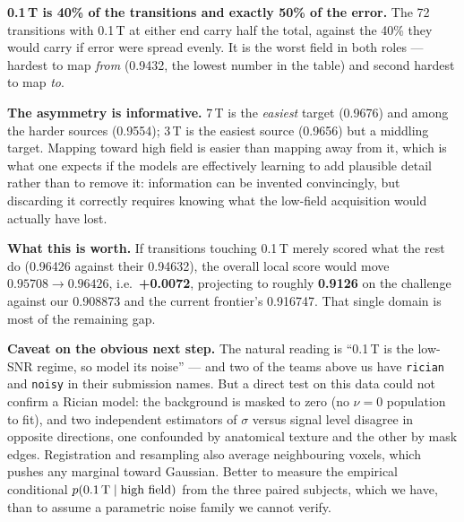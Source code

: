 \documentclass[10pt,a4paper]{article}
\begin{document}
\vspace{5mm}
{\small
\textbf{0.1\,T is 40\% of the transitions and exactly 50\% of the error.} The 72 transitions with
0.1\,T at either end carry half the total, against the 40\% they would carry if error were spread
evenly. It is the worst field in both roles --- hardest to map \emph{from} (0.9432, the lowest
number in the table) and second hardest to map \emph{to}.

\textbf{The asymmetry is informative.} 7\,T is the \emph{easiest} target (0.9676) and among the
harder sources (0.9554); 3\,T is the easiest source (0.9656) but a middling target. Mapping
toward high field is easier than mapping away from it, which is what one expects if the models
are effectively learning to add plausible detail rather than to remove it: information can be
invented convincingly, but discarding it correctly requires knowing what the low-field
acquisition would actually have lost.

\textbf{What this is worth.} If transitions touching 0.1\,T merely scored what the rest do
(0.96426 against their 0.94632), the overall local score would move
$0.95708 \rightarrow 0.96426$, i.e.\ \textbf{+0.0072}, projecting to roughly \textbf{0.9126} on
the challenge against our 0.908873 and the current frontier's 0.916747. That single domain is
most of the remaining gap.

\textbf{Caveat on the obvious next step.} The natural reading is ``0.1\,T is the low-SNR regime,
so model its noise'' --- and two of the teams above us have \texttt{rician} and \texttt{noisy} in
their submission names. But a direct test on this data could not confirm a Rician model: the
background is masked to zero (no $\nu=0$ population to fit), and two independent estimators of
$\sigma$ versus signal level disagree in opposite directions, one confounded by anatomical
texture and the other by mask edges. Registration and resampling also average neighbouring
voxels, which pushes any marginal toward Gaussian. Better to measure the empirical conditional
$p(\text{0.1\,T} \mid \text{high field})$ from the three paired subjects, which we have, than to
assume a parametric noise family we cannot verify.}
\end{document}
